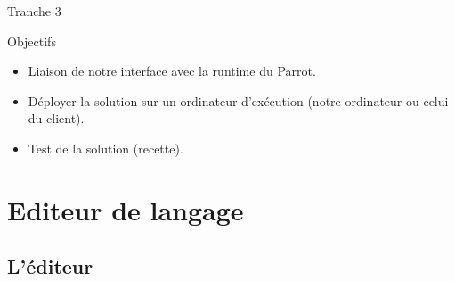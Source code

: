 \documentclass{bredelebeamer}
\begin{document}
\begin{frame}{Tranche 3}
\begin{alertblock}{Objectifs}
\begin{itemize}
\item Liaison de notre interface avec la runtime du Parrot.
\item Déployer la solution sur un ordinateur d'exécution (notre ordinateur ou celui du client).
\item Test de la solution (recette).
\end{itemize}
\end{alertblock}
\end{frame}

\section{Editeur de langage}
\subsection{L'éditeur}
\end{document}
